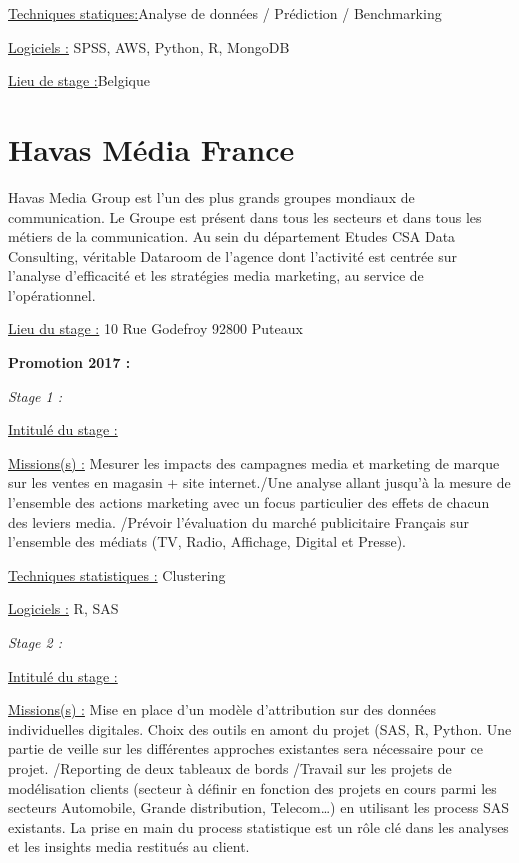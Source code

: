 \documentclass[
  letterpaper,
  DIV=11,
  numbers=noendperiod]{scrreprt}
\begin{document}
\uline{Techniques statiques:}Analyse de données / Prédiction /
Benchmarking

\uline{Logiciels :} SPSS, AWS, Python, R, MongoDB

\uline{Lieu de stage :}Belgique

\hypertarget{havas-muxe9dia-france}{%
\section{\texorpdfstring{\textbf{Havas Média
France}}{Havas Média France}}\label{havas-muxe9dia-france}}

Havas Media Group est l'un des plus grands groupes mondiaux de
communication. Le Groupe est présent dans tous les secteurs et dans tous
les métiers de la communication. Au sein du département Etudes CSA Data
Consulting, véritable Dataroom de l'agence dont l'activité est centrée
sur l'analyse d'efficacité et les stratégies media marketing, au service
de l'opérationnel.

\uline{Lieu du stage :} 10 Rue Godefroy 92800 Puteaux

\textbf{Promotion 2017 :}

\emph{Stage 1 :}

\uline{Intitulé du stage :}

\uline{Missions(s) :} Mesurer les impacts des campagnes media et
marketing de marque sur les ventes en magasin + site internet./Une
analyse allant jusqu'à la mesure de l'ensemble des actions marketing
avec un focus particulier des effets de chacun des leviers media.
/Prévoir l'évaluation du marché publicitaire Français sur l'ensemble des
médiats (TV, Radio, Affichage, Digital et Presse).

\uline{Techniques statistiques :} Clustering

\uline{Logiciels :} R, SAS

\emph{Stage 2 :}

\uline{Intitulé du stage :}

\uline{Missions(s) :} Mise en place d'un modèle d'attribution sur des
données individuelles digitales. Choix des outils en amont du projet
(SAS, R, Python. Une partie de veille sur les différentes approches
existantes sera nécessaire pour ce projet. /Reporting de deux tableaux
de bords /Travail sur les projets de modélisation clients (secteur à
définir en fonction des projets en cours parmi les secteurs Automobile,
Grande distribution, Telecom\ldots) en utilisant les process SAS
existants. La prise en main du process statistique est un rôle clé dans
les analyses et les insights media restitués au client.
\end{document}
